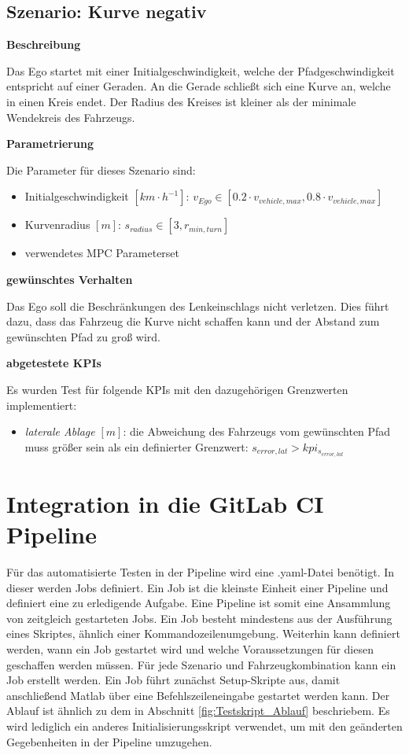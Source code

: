 \subsection{Szenario: Kurve negativ} \label{subsec:kurveNegativ}
\textbf{Beschreibung}

\noindent Das Ego startet mit einer Initialgeschwindigkeit, welche der Pfadgeschwindigkeit entspricht auf einer Geraden. An die Gerade schließt sich eine Kurve an, welche in einen Kreis endet. Der Radius des Kreises ist kleiner als der minimale Wendekreis des Fahrzeugs. 

\bigskip\noindent\textbf{Parametrierung}

\noindent Die Parameter für dieses Szenario sind:
\begin{itemize}
    \item Initialgeschwindigkeit $[km\cdot h^{-1}]$: $v_{Ego} \in [0.2\cdot v_{vehicle,max}, 0.8\cdot v_{vehicle,max}]$
    \item Kurvenradius $[m]$: $s_{radius} \in [3,r_{min,turn}]$
    \item verwendetes MPC Parameterset
\end{itemize}

\bigskip\noindent\textbf{gewünschtes Verhalten}

\noindent Das Ego soll die Beschränkungen des Lenkeinschlags nicht verletzen. Dies führt dazu, dass das Fahrzeug die Kurve nicht schaffen kann und der Abstand zum gewünschten Pfad zu groß wird.

\bigskip\noindent\textbf{abgetestete KPIs}

\noindent Es wurden Test für folgende KPIs mit den dazugehörigen Grenzwerten implementiert:
\begin{itemize}
    \item \textit{laterale Ablage} $[m]$: die Abweichung des Fahrzeugs vom gewünschten Pfad muss größer sein als ein definierter Grenzwert: $s_{error,lat} > kpi_{s_{error,lat}}$
\end{itemize}



\section{Integration in die GitLab CI Pipeline} \label{sec:CIPipeline}
Für das automatisierte Testen in der Pipeline wird eine .yaml-Datei benötigt. In dieser werden Jobs definiert. Ein Job ist die kleinste Einheit einer Pipeline und definiert eine zu erledigende Aufgabe. Eine Pipeline ist somit eine Ansammlung von zeitgleich gestarteten Jobs. Ein Job besteht mindestens aus der Ausführung eines Skriptes, ähnlich einer Kommandozeilenumgebung. Weiterhin kann definiert werden, wann ein Job gestartet wird und welche Voraussetzungen für diesen geschaffen werden müssen.
Für jede Szenario und Fahrzeugkombination kann ein Job erstellt werden. Ein Job führt zunächst Setup-Skripte aus, damit anschließend Matlab über eine Befehlszeileneingabe gestartet werden kann. Der Ablauf ist ähnlich zu dem in Abschnitt \ref{fig:Testskript_Ablauf} beschriebem. Es wird lediglich ein anderes Initialisierungsskript verwendet, um mit den geänderten Gegebenheiten in der Pipeline umzugehen.

